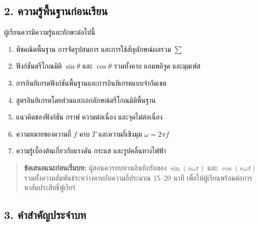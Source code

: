 \subsection{2. ความรู้พื้นฐานก่อนเรียน}

ผู้เรียนควรมีความรู้และทักษะต่อไปนี้

\begin{enumerate}
\def\labelenumi{\arabic{enumi}.}
\item
  พีชคณิตพื้นฐาน การจัดรูปสมการ และการใช้สัญลักษณ์ผลรวม \(\sum\)
\item
  ฟังก์ชันตรีโกณมิติ \(\sin \theta\) และ \(\cos \theta\) รวมทั้งคาบ แอมพลิจูด และมุมเฟส
\item
  การอินทิเกรตฟังก์ชันพื้นฐานและการอินทิเกรตแบบจำกัดเขต
\item
  สูตรอินทิเกรตโดยส่วนและเอกลักษณ์ตรีโกณมิติพื้นฐาน
\item
  แนวคิดของฟังก์ชัน กราฟ ความต่อเนื่อง และจุดไม่ต่อเนื่อง
\item
  ความหมายของความถี่ \(f\) คาบ \(T\) และความถี่เชิงมุม \(\omega=2\pi f\)
\item
  ความรู้เบื้องต้นเกี่ยวกับแรงดัน กระแส และรูปคลื่นทางไฟฟ้า
\end{enumerate}

\begin{quote}
\textbf{ข้อเสนอแนะก่อนเริ่มบท:} ผู้สอนควรทบทวนอินทิกรัลของ \(\sin(n\omega t)\) และ \(\cos(n\omega t)\) รวมทั้งความสัมพันธ์ระหว่างคาบกับความถี่ประมาณ 15--20 นาที เพื่อให้ผู้เรียนพร้อมต่อการหาสัมประสิทธิ์ฟูเรียร์
\end{quote}


\subsection{3. คำสำคัญประจำบท}

